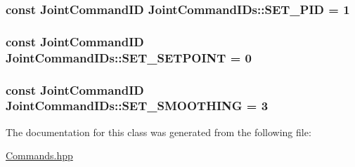 \subsubsection[{\texorpdfstring{S\+E\+T\+\_\+\+P\+ID}{SET_PID}}]{\setlength{\rightskip}{0pt plus 5cm}const {\bf Joint\+Command\+ID} Joint\+Command\+I\+Ds\+::\+S\+E\+T\+\_\+\+P\+ID = 1\hspace{0.3cm}{\ttfamily [static]}}\hypertarget{classJointCommandIDs_a4aaed21f38109293163281c9eff64c78}{}\label{classJointCommandIDs_a4aaed21f38109293163281c9eff64c78}
\subsubsection[{\texorpdfstring{S\+E\+T\+\_\+\+S\+E\+T\+P\+O\+I\+NT}{SET_SETPOINT}}]{\setlength{\rightskip}{0pt plus 5cm}const {\bf Joint\+Command\+ID} Joint\+Command\+I\+Ds\+::\+S\+E\+T\+\_\+\+S\+E\+T\+P\+O\+I\+NT = 0\hspace{0.3cm}{\ttfamily [static]}}\hypertarget{classJointCommandIDs_ab6cee2ae7d4cde9db2b016229c163629}{}\label{classJointCommandIDs_ab6cee2ae7d4cde9db2b016229c163629}
\subsubsection[{\texorpdfstring{S\+E\+T\+\_\+\+S\+M\+O\+O\+T\+H\+I\+NG}{SET_SMOOTHING}}]{\setlength{\rightskip}{0pt plus 5cm}const {\bf Joint\+Command\+ID} Joint\+Command\+I\+Ds\+::\+S\+E\+T\+\_\+\+S\+M\+O\+O\+T\+H\+I\+NG = 3\hspace{0.3cm}{\ttfamily [static]}}\hypertarget{classJointCommandIDs_a725ccc7643d16d449814be53cd1f8cd8}{}\label{classJointCommandIDs_a725ccc7643d16d449814be53cd1f8cd8}


The documentation for this class was generated from the following file\+:\begin{DoxyCompactItemize}
\item 
\hyperlink{Commands_8hpp}{Commands.\+hpp}\end{DoxyCompactItemize}

